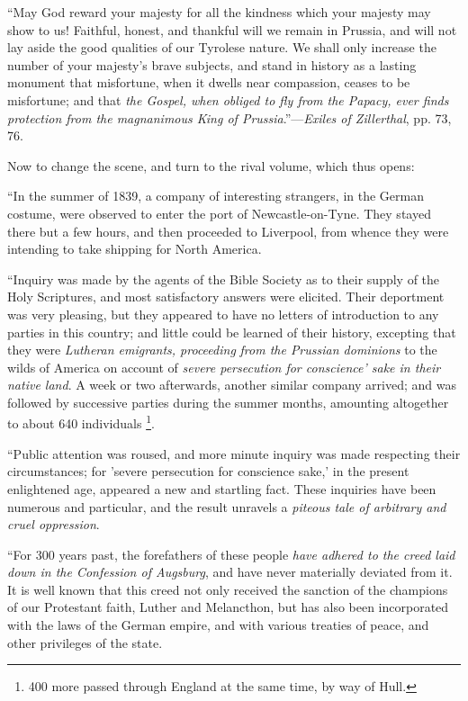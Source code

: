 ``May God reward your majesty for all
the kindness which your majesty may show to us! Faithful, honest, and
thankful will we remain in Prussia, and will not lay aside the good
qualities of our Tyrolese nature. We shall only increase the number of
your majesty's brave subjects, and stand in history as a lasting
monument that misfortune, when it dwells near compassion, ceases to be
misfortune; and that \emph{the Gospel, when obliged to fly from the Papacy,
ever finds protection from the magnanimous King of Prussia}.''—\emph{Exiles
of Zillerthal}, pp. 73, 76.

Now to change the scene, and turn to the rival
volume, which thus opens:

``In the summer of 1839, a company of
interesting strangers, in the German costume, were observed to enter the
port of Newcastle-on-Tyne. They stayed there but a few hours, and then
proceeded to Liverpool, from whence they were intending to take shipping
for North America.

``Inquiry was made by the agents of
the Bible Society as to their supply of the Holy Scriptures, and most
satisfactory answers were elicited. Their deportment was very pleasing,
but they appeared to have no letters of introduction to any parties in
this country; and little could be learned of their history, excepting
that they were \emph{Lutheran emigrants, proceeding} \emph{from
the Prussian dominions} to the wilds of America on account of \emph{severe
persecution for conscience' sake in their native land}. A week or two
afterwards, another similar company arrived; and was followed by
successive parties during the summer months, amounting altogether to
about 640 individuals \footnote{400 more passed through England at the same
time, by way of Hull.}.

``Public attention was roused, and
more minute inquiry was made respecting their circumstances; for 'severe
persecution for conscience sake,' in the present enlightened age,
appeared a new and startling fact. These inquiries have been numerous
and particular, and the result unravels a \emph{piteous tale of arbitrary
and cruel oppression}.

``For 300 years past, the forefathers
of these people \emph{have adhered to the creed laid down in the Confession
of Augsburg}, and have never materially deviated from it. It is well
known that this creed not only received the sanction of the champions of
our Protestant faith, Luther and Melancthon, but has also been
incorporated with the laws of the German empire, and with various
treaties of peace, and other privileges of the state.

